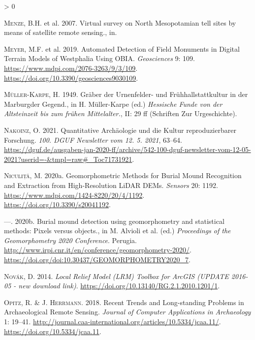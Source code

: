 \documentclass[
  12pt,
]{article}
\newlength{\cslhangindent}
\newenvironment{CSLReferences}[2] %
 {%
  \setlength{\parindent}{0pt}
  \ifodd #1 \everypar{\setlength{\hangindent}{\cslhangindent}}\ignorespaces\fi
  \ifnum #2 > 0
  \setlength{\parskip}{#2\baselineskip}
  \fi
 }%
 {}
\begin{document}
\begin{CSLReferences}{1}{0}
\leavevmode\hypertarget{ref-Menze2007VirtualSO}{}%
\textsc{Menze}, B.H. et al. 2007. Virtual survey on {North} {Mesopotamian} tell sites by means of satellite remote sensing., in.

\leavevmode\hypertarget{ref-meyerAutomatedDetectionField2019a}{}%
\textsc{Meyer}, M.F. et al. 2019. Automated {Detection} of {Field} {Monuments} in {Digital} {Terrain} {Models} of {Westphalia} {Using} {OBIA}. \emph{Geosciences} 9: 109. \url{https://www.mdpi.com/2076-3263/9/3/109}. \url{https://doi.org/10.3390/geosciences9030109}.

\leavevmode\hypertarget{ref-muller-karpeGraberUrnenfelderUnd1949}{}%
\textsc{Müller-Karpe}, H. 1949. Gräber der {Urnenfelder}- und {Frühhallstattkultur} in der {Marburgder} {Gegend}., in H. Müller-Karpe (ed.) \emph{Hessische {Funde} von der {Altsteinzeit} bis zum frühen {Mittelalter}.}, II: 29 ff (Schriften Zur {Urgeschichte}).

\leavevmode\hypertarget{ref-nakoinzQuantitativeArchaologieUnd2021}{}%
\textsc{Nakoinz}, O. 2021. Quantitative {Archäologie} und die {Kultur} reproduzierbarer {Forschung}. \emph{100. DGUF Newsletter vom 12. 5. 2021}, 63--64. \url{https://dguf.de/ausgaben-jan-2020-ff/archive/542-100-dguf-newsletter-vom-12-05-2021?userid=-\&tmpl=raw\#_Toc71731921}.

\leavevmode\hypertarget{ref-niculitaGeomorphometricMethodsBurial2020b}{}%
\textsc{Niculiță}, M. 2020a. Geomorphometric {Methods} for {Burial} {Mound} {Recognition} and {Extraction} from {High}-{Resolution} {LiDAR} {DEMs}. \emph{Sensors} 20: 1192. \url{https://www.mdpi.com/1424-8220/20/4/1192}. \url{https://doi.org/10.3390/s20041192}.

\leavevmode\hypertarget{ref-niculitaBurialMoundDetection2020a}{}%
---. 2020b. Burial mound detection using geomorphometry and statistical methods: Pixels versus objects., in M. Alvioli et al. (ed.) \emph{Proceedings of the {Geomorphometry} 2020 {Conference}}. Perugia. \url{http://www.irpi.cnr.it/en/conference/geomorphometry-2020/}. \url{https://doi.org/doi:10.30437/GEOMORPHOMETRY2020_7}.

\leavevmode\hypertarget{ref-novakLocalReliefModel2014}{}%
\textsc{Novák}, D. 2014. \emph{Local {Relief} {Model} ({LRM}) {Toolbox} for {ArcGIS} ({UPDATE} 2016-05 - new download link)}. \url{https://doi.org/10.13140/RG.2.1.2010.1201/1}.

\leavevmode\hypertarget{ref-opitzRecentTrendsLongstanding2018}{}%
\textsc{Opitz}, R. \& J. \textsc{Herrmann}. 2018. Recent {Trends} and {Long}-standing {Problems} in {Archaeological} {Remote} {Sensing}. \emph{Journal of Computer Applications in Archaeology} 1: 19--41. \url{http://journal.caa-international.org/articles/10.5334/jcaa.11/}. \url{https://doi.org/10.5334/jcaa.11}.


\end{CSLReferences}
\end{document}

